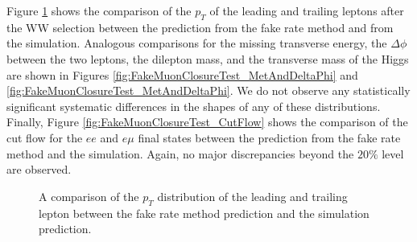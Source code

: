 Figure \ref{fig:FakeMuonClosureTest_LeptonPt} shows the comparison of the $p_{T}$
of the leading and trailing leptons after the WW selection between the prediction
from the fake rate method and from the simulation. Analogous comparisons for 
the missing transverse energy, the $\Delta\phi$ between the two leptons, 
the dilepton mass, and the transverse mass of the Higgs are shown in 
Figures \ref{fig:FakeMuonClosureTest_MetAndDeltaPhi} and 
\ref{fig:FakeMuonClosureTest_MetAndDeltaPhi}. We do not observe any statistically 
significant systematic differences in the shapes of any of these distributions. Finally, 
Figure \ref{fig:FakeMuonClosureTest_CutFlow} shows the comparison of the 
cut flow for the $ee$ and $e\mu$ final states between
the prediction from the fake rate method and the simulation. Again, no major 
discrepancies beyond the $20\%$ level are observed. 


\begin{figure}[!htbp]
\begin{center}
\caption{A comparison of the $p_{T}$ distribution of the leading and trailing lepton
between the fake rate method prediction and the simulation prediction. }
\label{fig:FakeMuonClosureTest_LeptonPt}
\end{center}
\end{figure}

